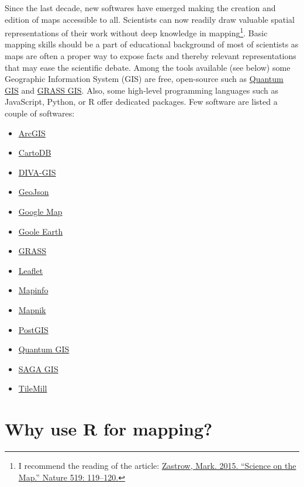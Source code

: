 \documentclass[]{report}
\providecommand{\tightlist}{%
  \setlength{\itemsep}{0pt}\setlength{\parskip}{0pt}}
\let\rmarkdownfootnote\footnote%
\def\footnote{\protect\rmarkdownfootnote}
\begin{document}
Since the last decade, new softwares have emerged making the creation
and edition of maps accessible to all. Scientists can now readily draw
valuable spatial representations of their work without deep knowledge in
mapping\footnote{I recommend the reading of the article:
  \href{http://www.nature.com/news/data-visualization-science-on-the-map-1.17024}{Zastrow,
  Mark. 2015. ``Science on the Map.'' Nature 519: 119--120.}}. Basic
mapping skills should be a part of educational background of most of
scientists as maps are often a proper way to expose facts and thereby
relevant representations that may ease the scientific debate. Among the
tools available (see below) some Geographic Information System (GIS) are
free, open-source such as \href{http://qgis.org/en/site/}{Quantum GIS}
and \href{http://grass.osgeo.org}{GRASS GIS}. Also, some high-level
programming languages such as JavaScript, Python, or R offer dedicated
packages. Few software are listed a couple of softwares:

\begin{itemize}
\tightlist
\item
  \href{http://www.arcgis.com/features/}{ArcGIS}
\item
  \href{http://cartodb.com}{CartoDB}
\item
  \href{http://www.diva-gis.org}{DIVA-GIS}
\item
  \href{http://geojson.io/\#map=2/20.0/0.0}{GeoJson}
\item
  \href{https://www.google.fr/maps}{Google Map}
\item
  \href{http://www.google.fr/intl/eng/earth/index.html}{Goole Earth}
\item
  \href{http://grass.osgeo.org}{GRASS}
\item
  \href{http://leafletjs.com}{Leaflet}
\item
  \href{http://www.mapinfo.com}{Mapinfo}
\item
  \href{http://mapnik.org}{Mapnik}
\item
  \href{http://www.postgis.org}{PostGIS}
\item
  \href{http://qgis.org/en/site/}{Quantum GIS}
\item
  \href{http://www.saga-gis.org/en/index.html}{SAGA GIS}
\item
  \href{https://www.mapbox.com/tilemill/}{TileMill}
\end{itemize}

\hypertarget{why-use-r-for-mapping}{%
\section{Why use R for mapping?}\label{why-use-r-for-mapping}}
\end{document}
